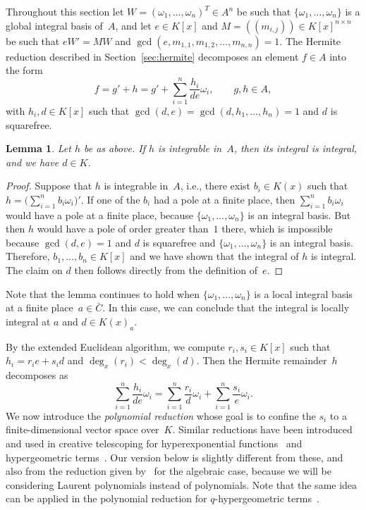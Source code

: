 \documentclass[final,1p,times,authoryear]{elsarticle}
\newtheorem{lemma}[theorem]{Lemma}
\begin{document}
Throughout this section let $W=(\omega_1,\ldots,\omega_n)^T\in A^n$ be such
that $\{\omega_1, \ldots, \omega_n\}$ is a global integral basis of~$A$, and
let $e\in K[x]$ and $M=((m_{i,j}))\in K[x]^{n\times n}$ be such that $eW'=MW$
and $\gcd(e, m_{1, 1}, m_{1, 2}, \ldots, m_{n ,n})=1$. The Hermite reduction
described in Section~\ref{sec:hermite} decomposes an element $f\in A$ into
the form
\[
  f = g' + h = g' + \sum_{i=1}^n \frac{h_i}{de} \omega_i,\qquad
  g, h\in A,
\]
with $h_i, d\in K[x]$ such that $\gcd(d, e)=\gcd(d,h_1,\dots,h_n)=1$ and $d$ is squarefree.
\begin{lemma}\label{LEM:d}
  Let $h$ be as above. If $h$ is integrable in~$A$,
  then its integral is integral, and we have $d\in K$.
\end{lemma}
\begin{proof}
  Suppose that $h$ is integrable in~$A$, i.e., there exist $b_i\in K(x)$
  such that $h = \bigl(\sum_{i=1}^n b_i \omega_i\bigr)'$.
  If one of the $b_i$ had a pole at a finite place, then $\sum_{i=1}^n b_i\omega_i$
  would have a pole at a finite place, because $\{\omega_1,\dots,\omega_n\}$ is
  an integral basis. But then $h$ would have a pole of order greater than~$1$
  there, which is impossible because $\gcd(d,e)=1$ and $d$ is squarefree and
  $\{\omega_1,\dots,\omega_n\}$ is an integral basis.
  Therefore, $b_1,\dots,b_n\in K[x]$ and we have shown that the integral of $h$
  is integral. The claim on $d$ then follows directly from the definition of~$e$.
\end{proof}

Note that the lemma continues to hold when $\{\omega_1,\dots,\omega_n\}$ is
a local integral basis at a finite place~$a\in\bar C$. In this case, we can conclude
that the integral is locally integral at $a$ and $d\in K(x)_a$. 

By the extended Euclidean algorithm, we compute $r_i, s_i\in K[x]$ such that
$h_i = r_i e + s_i d$ and $\deg_x(r_i) < \deg_x(d)$. Then the Hermite remainder~$h$
decomposes as
\begin{equation}\label{EQ:h}
  \sum_{i=1}^n \frac{h_i}{de}\omega_i =
  \sum_{i=1}^n \frac{r_i}{d}\omega_i +
  \sum_{i=1}^n \frac{s_i}{e}\omega_i.
\end{equation}
We now introduce the \emph{polynomial reduction} whose goal is to confine the $s_i$ to a finite-dimensional
vector space over~$K$. Similar reductions have been introduced and used in creative telescoping
for hyperexponential functions~\citep{bostan13a} and hypergeometric terms~\citep{chen15a}.
Our version below is slightly different from these, and also from the reduction given by~\cite{chen16} for
the algebraic case, because we will be considering Laurent polynomials instead of polynomials.
Note that the same idea can be applied in the polynomial reduction for $q$-hypergeometric terms~\cite{du16}.
\end{document}
